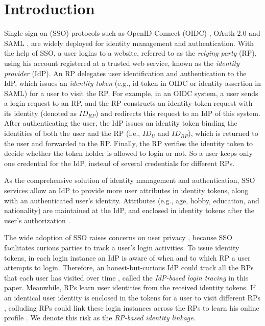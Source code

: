 \section{Introduction}
\label{sec:intro}
Single sign-on (SSO) protocols such as OpenID Connect (OIDC) \cite{OpenIDConnect}, OAuth 2.0 \cite{rfc6749} and SAML \cite{SAML,SAMLIdentifier},
 are widely deployed for identity management and authentication.
 With the help of SSO,
  a user logins to a website, referred to as the \emph{relying party} (RP), using his account registered at a trusted web service,
   known as the \emph{identity provider} (IdP).
An RP delegates user identification and authentication to the IdP,
    which issues an \emph{identity token} (e.g., id token in OIDC or identity assertion in SAML) for a user to visit the RP. %
For example, in an OIDC system,
     a user sends a login request to an RP,
and the RP constructs an identity-token request with its identity (denoted as $ID_{RP}$) and redirects this request to an IdP of this system.
After authenticating the user,
 the IdP issues an identity token binding the identities of both the user and the RP (i.e., $ID_U$ and $ID_{RP}$),
    which is returned to the user and forwarded to the RP.
Finally, the RP verifies the identity token to decide whether the token holder is allowed to login or not.
So a user keeps only one credential for the IdP, instead of several credentials for different RPs.

As the comprehensive solution of identity management and authentication,
    SSO services allow an IdP to provide more user attributes in identity tokens,
        along with an authenticated user's identity.
Attributes (e.g., age, hobby, education, and nationality) are maintained at the IdP,
    and enclosed in identity tokens after the user's authorization \cite{OpenIDConnect,rfc6749}.

The wide adoption of SSO raises concerns on user privacy \cite{NIST2017draft,SPRESSO,BrowserID,maler2008venn},
 because SSO facilitates curious parties to track a user's login activities.
To issue identity tokens,
in each login instance
 an IdP is aware of when and to which RP a user attempts to login.
Therefore, an honest-but-curious IdP could track all the RPs that each user has visited over time \cite{BrowserID,SPRESSO},
 called the {\em IdP-based login tracing} in this paper.
Meanwhile, RPs learn user identities from the received identity tokens.
If an identical user identity is enclosed in the tokens for a user to visit different RPs \cite{maler2008venn,Google,FirefoxAccount},
     colluding RPs could link these login instances across the RPs %
      to learn his online profile \cite{maler2008venn}.
We denote this risk as the {\em RP-based identity linkage}.



